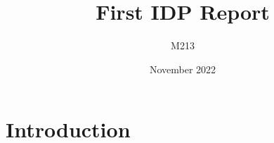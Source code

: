 \documentclass{article}
\title{First IDP Report}
\author{M213}
\date{November 2022}
\begin{document}
\maketitle

\section{Introduction}
\end{document}
